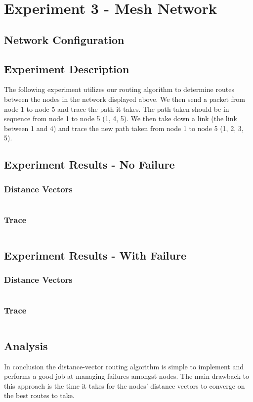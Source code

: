 \documentclass[fleqn,11pt]{article}
\begin{document}
\section{Experiment 3 - Mesh Network}
  \subsection{Network Configuration}
    
  \subsection{Experiment Description}
    The following experiment utilizes our routing algorithm to determine routes
    between the nodes in the network displayed above. We then send a packet
    from node 1 to node 5 and trace the path it takes. The path taken should be
    in sequence from node 1 to node 5 (1, 4, 5). We then take down a link
    (the link between 1 and 4) and trace the new path taken
    from node 1 to node 5 (1, 2, 3, 5).

  \subsection{Experiment Results - No Failure}
  \subsubsection{Distance Vectors}
    \begin{verbatim}
    \end{verbatim}
  \subsubsection{Trace}
    \begin{verbatim}
    \end{verbatim}

  \subsection{Experiment Results - With Failure}
  \subsubsection{Distance Vectors}
    \begin{verbatim}
    \end{verbatim}
  \subsubsection{Trace}
    \begin{verbatim}
    \end{verbatim}

  \subsection{Analysis}
    In conclusion the distance-vector routing algorithm is simple to implement and performs a good job at managing failures amongst nodes.
    The main drawback to this approach is the time it takes for the nodes' distance vectors to converge on the best routes to take.
\end{document}
